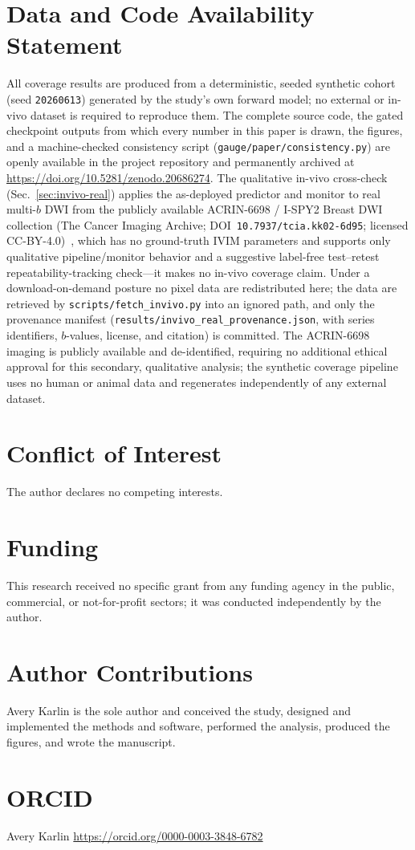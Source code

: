 \documentclass[11pt]{article}
\begin{document}
\section*{Data and Code Availability Statement}
All coverage results are produced from a deterministic, seeded synthetic cohort
(seed \texttt{20260613}) generated by the study's own forward model; no external or
in-vivo dataset is required to reproduce them. The complete source code, the gated
checkpoint outputs from which every number in this paper is drawn, the figures, and
a machine-checked consistency script (\texttt{gauge/paper/consistency.py}) are
openly available in the project repository and permanently archived at
\href{https://doi.org/10.5281/zenodo.20686274}{https://doi.org/10.5281/zenodo.20686274}.
The qualitative in-vivo cross-check (Sec.~\ref{sec:invivo-real}) applies the
as-deployed predictor and monitor to real multi-$b$ DWI from the publicly available
ACRIN-6698 / I-SPY2 Breast DWI collection (The Cancer Imaging Archive;
DOI~\texttt{10.7937/tcia.kk02-6d95}; licensed CC-BY-4.0)~\cite{acrin6698,clark2013tcia},
which has no ground-truth IVIM parameters and supports only qualitative
pipeline/monitor behavior and a suggestive label-free test--retest
repeatability-tracking check---it makes no in-vivo coverage claim. Under a
download-on-demand posture no pixel data are redistributed here; the data are
retrieved by \texttt{scripts/fetch\_invivo.py} into an ignored path, and only the
provenance manifest (\texttt{results/invivo\_real\_provenance.json}, with series
identifiers, $b$-values, license, and citation) is committed. The ACRIN-6698 imaging
is publicly available and de-identified, requiring no additional ethical approval for
this secondary, qualitative analysis; the synthetic coverage pipeline uses no human
or animal data and regenerates independently of any external dataset.

\section*{Conflict of Interest}
The author declares no competing interests.

\section*{Funding}
This research received no specific grant from any funding agency in the public,
commercial, or not-for-profit sectors; it was conducted independently by the
author.

\section*{Author Contributions}
Avery Karlin is the sole author and conceived the study, designed and implemented
the methods and software, performed the analysis, produced the figures, and wrote
the manuscript.

\section*{ORCID}
Avery Karlin \quad \href{https://orcid.org/0000-0003-3848-6782}{https://orcid.org/0000-0003-3848-6782}



\end{document}

